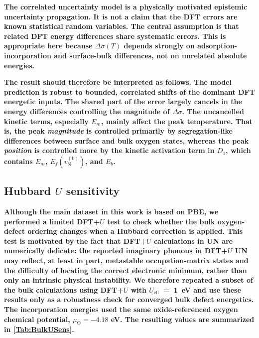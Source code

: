 \documentclass[preprint,12pt,sort&compress]{elsarticle}
\newcommand{\?}{\stackrel{?}{=}}
\providecommand{\DIFaddtex}[1]{{\bf #1}} %
\providecommand{\DIFadd}[1]{\texorpdfstring{\DIFaddtex{#1}}{#1}} %
\begin{document}
\DIFadd{The correlated uncertainty model is a physically motivated epistemic uncertainty propagation. It is not a claim that the DFT errors are known statistical random variables. The central assumption is that related DFT energy differences share systematic errors. This is appropriate here because $\Delta\sigma(T)$ depends strongly on adsorption-incorporation and surface-bulk differences, not on unrelated absolute energies.
}

\DIFadd{The result should therefore be interpreted as follows. The model prediction is robust to bounded, correlated shifts of the dominant DFT energetic inputs. The shared part of the error largely cancels in the energy differences controlling the magnitude of $\Delta\sigma$. The uncancelled kinetic terms, especially $E_m$, mainly affect the peak temperature. That is, the peak \textit{magnitude} is controlled primarily by segregation-like differences between surface and bulk oxygen states, whereas the peak \textit{position} is controlled more by the kinetic activation term in $D_1$, which contains $E_m$, $E_f(v_\mathrm{N}^{(\mathrm{b})})$, and $E_b$.
}

\subsection{\DIFadd{Hubbard $U$ sensitivity}}
\label{App:UQ:U}

\DIFadd{Although the main dataset in this work is based on PBE, we performed a limited DFT+$U$ test to check whether the bulk oxygen-defect ordering changes when a Hubbard correction is applied. This test is motivated by the fact that DFT+$U$ calculations in UN are numerically delicate: the reported imaginary phonons in DFT+$U$ UN \cite{Kocevski2022I} may reflect, at least in part, metastable occupation-matrix states and the difficulty of locating the correct electronic minimum, rather than only an intrinsic physical instability. We therefore repeated a subset of the bulk calculations using DFT+$U$ with $U_\text{eff}$~=~1~eV and use these results only as a robustness check for converged bulk defect energetics. The incorporation energies used the same oxide-referenced oxygen chemical potential, $\mu_\mathrm{O}=-4.18$ eV. The resulting values are summarized in \cref{Tab:BulkUSens}.
}
\end{document}
